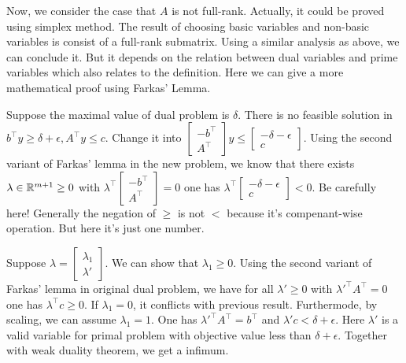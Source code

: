 \documentclass[12pt]{article}
\begin{document}
  Now, we consider the case that $A$ is not full-rank. Actually, it could be proved using simplex method. The result of choosing basic variables and non-basic variables is consist of a full-rank submatrix. Using a similar analysis as above, we can conclude it. But it depends on the relation between dual variables and prime variables which also relates to the definition.  Here we can give a more mathematical proof using Farkas' Lemma.

\begin{Proof}
  Suppose the maximal value of dual problem is
  $\delta$. There is no feasible solution in
  $b^\top y \geq \delta + \epsilon, A^\top y
  \leq c$. Change it into
  $\begin{bmatrix} -b^\top \\ A^\top
   \end{bmatrix} y \leq
   \begin{bmatrix} - \delta - \epsilon \\
     c \end{bmatrix}$.
   Using the second variant of Farkas' lemma
   in the new problem, we know that there
   exists $\lambda \in \mathbb{R}^{m+1} \geq 0$ with
   $\lambda^\top
   \begin{bmatrix} -b^\top \\
     A^\top
   \end{bmatrix} = 0$ one has
   $\lambda^\top
   \begin{bmatrix} - \delta - \epsilon \\
     c \end{bmatrix} < 0$.
   Be carefully here! Generally the negation
   of $\geq$ is not $<$ because it's
   compenant-wise operation. But here it's
   just one number.

   Suppose $\lambda =
   \begin{bmatrix} \lambda_1 \\ \lambda'
   \end{bmatrix}$. We can show that
   $\lambda_1 \geq 0$. Using the second
   variant of Farkas' lemma in original dual
   problem, we have for all $\lambda' \geq 0$
   with $\lambda'^\top A^\top = 0$ one has
   $\lambda^\top c \geq 0$. If
   $\lambda_1 = 0$, it conflicts with previous
   result. Furthermode, by scaling, we can
   assume $\lambda_1 = 1$. One has
   $\lambda'^\top A^\top = b^\top$ and
   $\lambda' c < \delta + \epsilon$. Here
   $\lambda'$ is a valid variable for primal
   problem with objective value less than
   $\delta + \epsilon$. Together with weak
   duality theorem, we get a infimum.
  
\end{Proof}
\end{document}

